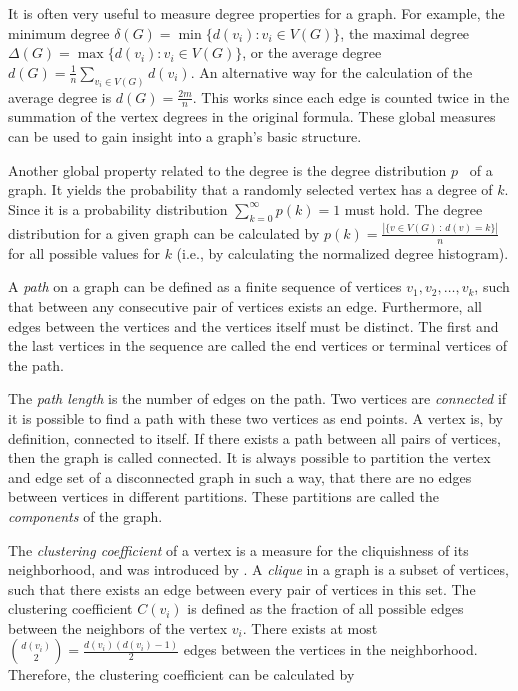 It is often very useful to measure degree properties for a graph.
For example, the minimum degree \( \delta(G) = \min\{d(v_i) : v_i \in V(G)\} \), the maximal degree \( \Delta(G) = \max\{d(v_i) : v_i \in V(G)\} \), or the average degree \( d(G) = \frac{1}{n} \sum_{v_i \in V(G)} d(v_i) \).
An alternative way for the calculation of the average degree is \( d(G) = \frac{2m}{n} \).
This works since each edge is counted twice in the summation of the vertex degrees in the original formula.
These global measures can be used to gain insight into a graph's basic structure.

Another global property related to the degree is the degree distribution \( p \)~\cite{Barabasi2016} of a graph.
It yields the probability that a randomly selected vertex has a degree of \(k\).
Since it is a probability distribution \( \sum_{k=0}^\infty p(k) = 1 \) must hold.
The degree distribution for a given graph can be calculated by \( p(k) = \frac{|\{v \in V(G) \,:\, d(v) = k\}|}{n} \) for all possible values for \( k \) (i.e., by calculating the normalized degree histogram).

A \emph{path} on a graph can be defined as a finite sequence of vertices \( v_1,v_2,\dots,v_k \), such that between any consecutive pair of vertices exists an edge.
Furthermore, all edges between the vertices and the vertices itself must be distinct.
The first and the last vertices in the sequence are called the end vertices or terminal vertices of the path.

The \emph{path length} is the number of edges on the path.
Two vertices are \emph{connected} if it is possible to find a path with these two vertices as end points.
A vertex is, by definition, connected to itself.
If there exists a path between all pairs of vertices, then the graph is called connected.
It is always possible to partition the vertex and edge set of a disconnected graph in such a way, that there are no edges between vertices in different partitions.
These partitions are called the \emph{components} of the graph.

The \emph{clustering coefficient} of a vertex is a measure for the cliquishness of its neighborhood, and was introduced by \citet{Watts1998}.
A \emph{clique} in a graph is a subset of vertices, such that there exists an edge between every pair of vertices in this set.
The clustering coefficient \( C(v_i) \) is defined as the fraction of all possible edges between the neighbors of the vertex \( v_i \).
There exists at most \( \binom{d(v_i)}{2} = \frac{d(v_i)(d(v_i) - 1)}{2} \) edges between the vertices in the neighborhood.
Therefore, the clustering coefficient can be calculated by

